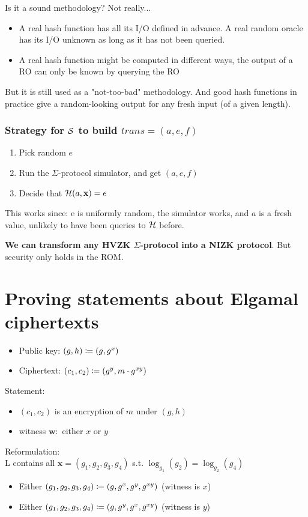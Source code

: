 \documentclass[12pt]{article}
\begin{document}
Is it a sound methodology? Not really...
\begin{itemize}
	\item A real hash function has all its I/O defined in advance. A real random oracle has its I/O unknown as long as it  has not been queried.
	\item A real hash function might be computed in different ways, the output of a RO can only be known by querying the RO
\end{itemize}

But it is still used as a "not-too-bad" methodology. And good hash functions in practice give a random-looking output for any fresh input (of a given length).


\subsubsection{Strategy for $\S$ to build $trans=(a,e,f)$}
\begin{enumerate}
	\item Pick random $e$
	\item Run the $\Sigma$-protocol simulator, and get $(a,e,f)$
	\item Decide that $\H(a, \mathbf{x})=e$
\end{enumerate}
This works since: e is uniformly random, the simulator works, and $a$ is a fresh value, unlikely to have been queries to $\H$ before.

\textbf{We can transform any HVZK $\Sigma$-protocol into a NIZK protocol}. But security only holds in the ROM.

\section{Proving statements about Elgamal ciphertexts}
\begin{itemize}
\item Public key: $(g,h)\define (g,g^x)$
\item Ciphertext: $(c_1,c_2)\define (g^y,m\cdot g^{xy})$
\end{itemize}

Statement:
\begin{itemize}
\item $(c_1,c_2)$ is an encryption of $m$ under $(g,h)$
\item witness $\mathbf{w}:$ either $x$ or $y$
\end{itemize}

Reformulation:\\
L contains all $\mathbf{x} = (g_1,g_2,g_3,g_4)$ s.t. $\log_{g_1}(g_2) = \log_{g_2}(g_4)$
\begin{itemize}
\item Either $(g_1,g_2,g_3,g_4) \define (g,g^x,g^y ,g^{xy})$ (witness is $x$)
\item Either $(g_1,g_2,g_3,g_4) \define (g,g^y,g^x ,g^{xy})$ (witness is $y$)
\end{itemize}
\end{document}
